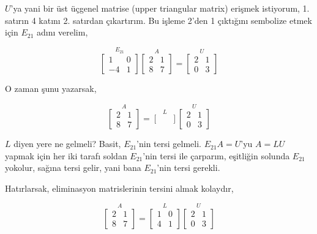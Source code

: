 \documentclass[12pt,fleqn]{article}\usepackage{../../common}
\begin{document}
$U$'ya yani bir üst üçgenel matrise (upper triangular matrix) erişmek
istiyorum, 1. satırın 4 katını 2. satırdan çıkartırım. Bu işleme 2'den 
1 çıktığını sembolize etmek için $E_{21}$ adını verelim, 

$$ 
\stackrel{E_{21}}{
\left[\begin{array}{rr}
1 & 0 \\ -4 & 1
\end{array}\right]
}
\stackrel{A}{
\left[\begin{array}{rr}
2 & 1 \\ 8 & 7
\end{array}\right]
}
=
\stackrel{U}{
\left[\begin{array}{rr}
2 & 1 \\ 0 & 3
\end{array}\right]
}
 $$

O zaman şunu yazarsak, 

$$ 
\stackrel{A}{
\left[\begin{array}{rr}
2 & 1 \\ 8 & 7
\end{array}\right]
}
=
\stackrel{L}{
\left[\begin{array}{rr}
 &  \\  & 
\end{array}\right]
}
\stackrel{U}{
\left[\begin{array}{rr}
2 & 1 \\ 0 & 3
\end{array}\right]
}
 $$

$L$ diyen yere ne gelmeli? Basit, $E_{21}$'nin tersi gelmeli. $E_{21}A =
U$'yu $A=LU $ yapmak için her iki tarafı soldan $E_{21}$'nin tersi ile
çarparım, eşitliğin solunda $E_{21}$ yokolur, sağına tersi gelir, yani
bana $E_{21}$'nin tersi gerekli.

Hatırlarsak, eliminasyon matrislerinin tersini almak kolaydır,

$$ 
\stackrel{A}{
\left[\begin{array}{rr}
2 & 1 \\ 8 & 7
\end{array}\right]
}
=
\stackrel{L}{
\left[\begin{array}{rr}
1 & 0 \\ 4 & 1
\end{array}\right]
}
\stackrel{U}{
\left[\begin{array}{rr}
2 & 1 \\ 0 & 3
\end{array}\right]
}
 $$
\end{document}
